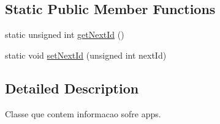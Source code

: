 \subsection*{Static Public Member Functions}
\begin{DoxyCompactItemize}
\item 
static unsigned int \hyperlink{class_app_aa1d00d182fcaf9fb8c85a0c0306a542d}{get\+Next\+Id} ()
\item 
static void \hyperlink{class_app_ac02dab3cd7642d98173bfd6365eb6d9e}{set\+Next\+Id} (unsigned int next\+Id)
\end{DoxyCompactItemize}


\subsection{Detailed Description}
Classe que contem informacao sofre apps. 


